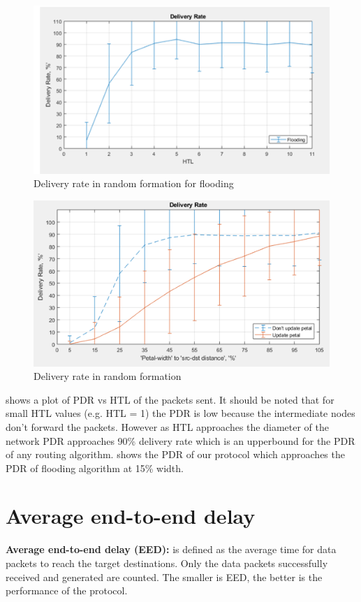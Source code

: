 \begin{figure}[hbtp]
\centering
\includegraphics[width=1\textwidth]{ncsuthesis-0.6/Chapter-5/figs/fl_DR_random.png}
\caption{Delivery rate in random formation for flooding}
\label{fig:fl_DR_random}
\end{figure}

\begin{figure}[hbtp]
\centering
\includegraphics[width=1\textwidth]{ncsuthesis-0.6/Chapter-5/figs/pe_DR_random.png}
\caption{Delivery rate in random formation}
\label{fig:pe_DR_random}
\end{figure}

 shows a plot of PDR vs HTL of the packets sent. It should be noted that for small HTL values (e.g. HTL = 1) the PDR is low because the intermediate nodes don't forward the packets. However as HTL approaches the diameter of the network PDR approaches 90\% delivery rate which is an upperbound for the PDR of any routing algorithm.  shows the PDR of our protocol which approaches the PDR of flooding algorithm at 15\% width.

\section{Average end-to-end delay}
    \textbf{Average end-to-end delay (EED):} is defined as the average time for data packets to reach the target destinations. Only the data packets successfully received and generated are counted. The smaller is EED, the better is the performance of the protocol.
    
